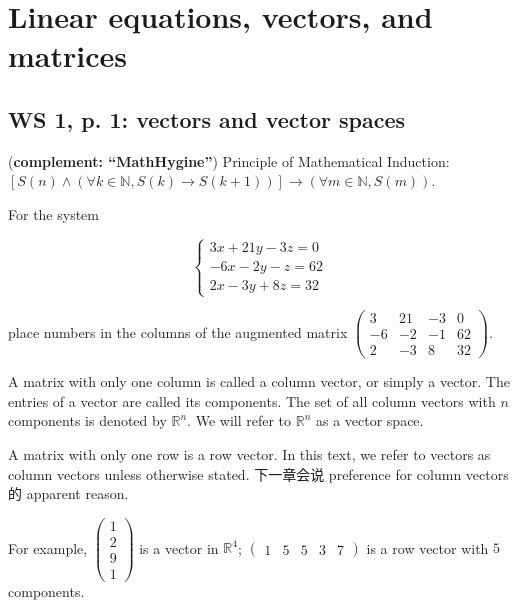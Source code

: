 \chapter{Linear equations, vectors, and matrices}

\section{WS 1, p. 1: vectors and vector spaces}

(\textbf{complement: ``MathHygine''}) Principle of Mathematical Induction: \(\left\lbrack {S(n) \land \left( {\forall k \in \mathbb{N},S(k)\rightarrow S\left( {k + 1} \right)} \right)} \right\rbrack\rightarrow\left( {\forall m \in \mathbb{N},S(m)} \right)\).

For the system

\[\left\{ \begin{matrix}
{3x + 21y - 3z = 0} \\
{- 6x - 2y - z = 62} \\
{2x - 3y + 8z = 32}
\end{matrix} \right.\]

place numbers in the columns of the augmented matrix \(\begin{pmatrix}
3 & 21 & {- 3} & 0 \\
{- 6} & {- 2} & {- 1} & 62 \\
2 & {- 3} & 8 & 32
\end{pmatrix}\).

\begin{definition}{}

A matrix with only one column is called a column vector, or simply a vector. The entries of a vector are called its components. The set of all column vectors with \(n\) components is denoted by \(\mathbb{R}^{n}\). We will refer to \(\mathbb{R}^{n}\) as a vector space.

A matrix with only one row is a row vector. In this text, we refer to vectors as column vectors unless otherwise stated. 下一章会说 preference for column vectors 的 apparent reason.

For example, \(\begin{pmatrix}
1 \\
2 \\
9 \\
1
\end{pmatrix}\) is a vector in \(\mathbb{R}^{4}\); \(\begin{pmatrix}
1 & 5 & 5 & 3 & 7
\end{pmatrix}\) is a row vector with \(5\) components.

\end{definition}

